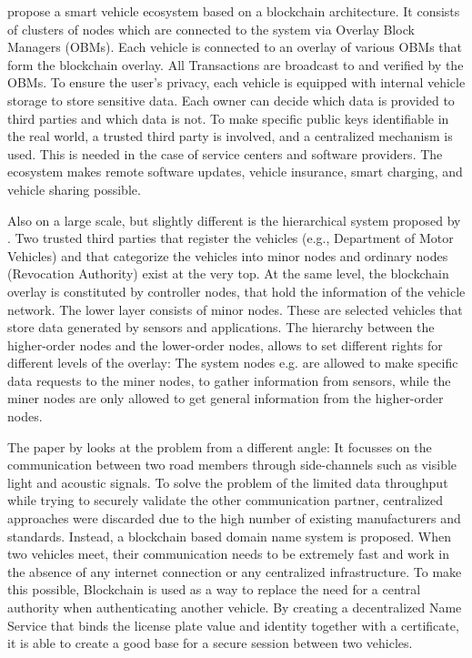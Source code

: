 \citeauthor{DorriSteger2017} propose a smart vehicle ecosystem based on a blockchain architecture. It consists of clusters of nodes which are connected to the system via Overlay Block Managers (OBMs). Each vehicle is connected to an overlay of various OBMs that form the blockchain overlay. All Transactions are broadcast to and verified by the OBMs.
To ensure the user's privacy, each vehicle is equipped with internal vehicle storage to store sensitive data. Each owner can decide which data is provided to third parties and which data is not.
To make specific public keys identifiable in the real world, a trusted third party is involved, and a centralized mechanism is used. This is needed in the case of service centers and software providers. The ecosystem makes remote software updates, vehicle insurance, smart charging, and vehicle sharing possible.

Also on a large scale, but slightly different is the hierarchical system proposed by \citeauthor{Sharma2017}. Two trusted third parties that register the vehicles (e.g., Department of Motor Vehicles) and that categorize the vehicles into minor nodes and ordinary nodes (Revocation Authority) exist at the very top. At the same level, the blockchain overlay is constituted by controller nodes, that hold the information of the vehicle network. The lower layer consists of minor nodes. These are selected vehicles that store data generated by sensors and applications. 
The hierarchy between the higher-order nodes and the lower-order nodes, allows to set different rights for different levels of the overlay: The system nodes e.g. are allowed to make specific data requests to the miner nodes, to gather information from sensors, while the miner nodes are only allowed to get general information from the higher-order nodes.

The paper by \citeauthor{Rowan2017} looks at the problem from a different angle: It focusses on the communication between two road members through side-channels such as visible light and acoustic signals. To solve the problem of the limited data throughput while trying to securely validate the other communication partner, centralized approaches were discarded due to the high number of existing manufacturers and standards. Instead, a blockchain based domain name system is proposed.
When two vehicles meet, their communication needs to be extremely fast and work in the absence of any internet connection or any centralized infrastructure. 
To make this possible, Blockchain is used as a way to replace the need for a central authority when authenticating another vehicle. By creating a decentralized Name Service that binds the license plate value and identity together with a certificate, it is able to create a good base for a secure session between two vehicles.

